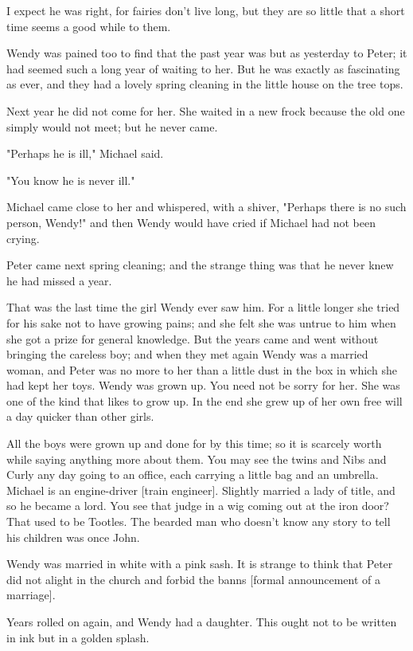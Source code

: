I expect he was right, for fairies don't live long, but they are so little
that a short time seems a good while to them.


Wendy was pained too to find that the past year was but as yesterday to
Peter; it had seemed such a long year of waiting to her. But he was
exactly as fascinating as ever, and they had a lovely spring cleaning in
the little house on the tree tops.


Next year he did not come for her. She waited in a new frock because the
old one simply would not meet; but he never came.


"Perhaps he is ill," Michael said.


"You know he is never ill."


Michael came close to her and whispered, with a shiver, "Perhaps there is
no such person, Wendy!" and then Wendy would have cried if Michael had not
been crying.


Peter came next spring cleaning; and the strange thing was that he never
knew he had missed a year.


That was the last time the girl Wendy ever saw him. For a little longer
she tried for his sake not to have growing pains; and she felt she was
untrue to him when she got a prize for general knowledge. But the years
came and went without bringing the careless boy; and when they met again
Wendy was a married woman, and Peter was no more to her than a little dust
in the box in which she had kept her toys. Wendy was grown up. You need
not be sorry for her. She was one of the kind that likes to grow up. In
the end she grew up of her own free will a day quicker than other girls.


All the boys were grown up and done for by this time; so it is scarcely
worth while saying anything more about them. You may see the twins and
Nibs and Curly any day going to an office, each carrying a little bag and
an umbrella. Michael is an engine-driver [train engineer]. Slightly
married a lady of title, and so he became a lord. You see that judge in a
wig coming out at the iron door? That used to be Tootles. The bearded man
who doesn't know any story to tell his children was once John.


Wendy was married in white with a pink sash. It is strange to think that
Peter did not alight in the church and forbid the banns [formal
announcement of a marriage].


Years rolled on again, and Wendy had a daughter. This ought not to be
written in ink but in a golden splash.


